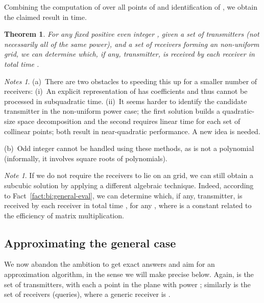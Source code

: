 \documentclass[11pt]{article}
\newtheorem{theorem}{Theorem}[section]
\theoremstyle{remark}
\newtheorem*{note}{Note}
\newtheorem*{notes}{Notes}
\begin{document}
Combining the computation of  over all points of 
and identification of , we obtain the claimed result in
 time.

\begin{theorem}
  \label{th:2d-receivers-on-grid}
  For any fixed positive even integer , given a set  of 
  transmitters (not necessarily all of the same power), and a set  of  receivers forming an  non-uniform grid, we can determine
  which, if any, transmitter, is received by each receiver in total time .
\end{theorem}


\begin{notes}
  (a)~There are two obstacles to speeding this up for a smaller number of receivers: (i)~An explicit representation of  has  coefficients and thus cannot be processed in subquadratic time.  (ii)~It seems harder to identify the candidate transmitter in the non-uniform power case; the first solution builds a quadratic-size space decomposition and the second requires linear time for each set of collinear points; both result in near-quadratic performance.  A new idea is needed.

  (b)~Odd integer  cannot be handled using these methods, as  is not a polynomial (informally, it involves square roots of polynomials).
\end{notes}

\begin{note}
  If we do not require the  receivers to lie on an  grid, we can still obtain a subcubic solution by applying a different algebraic technique. Indeed, according to Fact~\ref{fact:bi:general-eval}, we can determine which, if any, transmitter, is received by each receiver in total time , for any , where  is a constant related to the efficiency of matrix multiplication.    
\end{note}

\subsection{Approximating the general case}
\label{sec:approx}



We now abandon the ambition to get exact answers and aim
for an approximation algorithm, in the sense we will make precise
below.  Again,  is the set of  transmitters, with each
 a point in the plane with power ; similarly  is the
set of  receivers (queries), where a generic receiver is .
\end{document}
